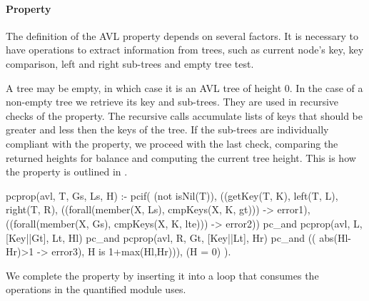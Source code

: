 




\paragraph{\bf Property}


The definition of the AVL property depends on several factors.
%
It is necessary to have operations to extract information from trees,
such as current node's key, key comparison, left and
right sub-trees and empty tree test.


A tree may be empty, in which case it is an AVL tree of height 0.
%
In the case of a non-empty tree we retrieve its key and sub-trees.
%
They are used in recursive checks of the property.
%
The recursive calls accumulate lists of keys that should be greater and
less then the keys of the tree.
%
If the sub-trees are individually compliant with the property, we
proceed with the last check, comparing the returned heights for
balance and computing the current tree height.
%
This is how the property is outlined in \plqc{}.
%

\pagebreak 
\begin{yapcode}
pcprop({avl, T, Gs, Ls, H}) :- pcif( (not isNil(T)),
 ((getKey(T, K), left(T, L),  right(T, R),
      ((forall(member(X, Ls), cmpKeys(X, K, gt))) -> error1),
      ((forall(member(X, Gs), cmpKeys(X, K, lte))) -> error2))
   pc_and pcprop({avl, L, [Key||Gt], Lt, Hl})
   pc_and pcprop({avl, R, Gt, [Key||Lt], Hr})
   pc_and (( abs(Hl-Hr)>1 -> error3), H is 1+max(Hl,Hr))),
 (H = 0) ).
\end{yapcode}
%
We complete the property by inserting it into a loop that consumes the
operations in the quantified module uses.



